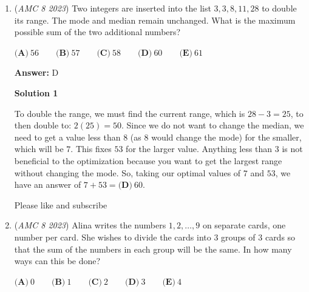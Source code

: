 \begin{enumerate}
 



\textbf{Solution 2}

Subtracting the larger equilateral triangle from the smaller one yields the sum of the three trapezoids. Since the ratio of the side lengths of the larger to the smaller one is $3:2$, we can set the side lengths as $3$ and $2$, respectively. So, the sum of the trapezoids is $\frac{9\sqrt{3}}{4}-\frac{4\sqrt{3}}{4}=\frac{5}{4}\sqrt{3}$. We are also told that the three trapezoids are congruent, thus the area of each of them is $\frac{1}{3} \cdot \frac{5}{4}\sqrt{3}=\frac{5}{12}\sqrt{3}$. Hence, the ratio is $\frac{\frac{5}{12}\sqrt{3}}{\sqrt{3}}=\frac{5}{12}=\boxed{\textbf{(C) } 5 : 12}$.

 


	\item (\textit{AMC 8 2023}) Two integers are inserted into the list $3,3,8,11,28$ to double its range. The mode and median remain unchanged. What is the maximum possible sum of the two additional numbers?


 $\textbf{(A)}\ 56 \qquad \textbf{(B)}\ 57 \qquad \textbf{(C)}\ 58 \qquad \textbf{(D)}\ 60 \qquad \textbf{(E)}\ 61$

 \textbf{Answer: }D



\textbf{Solution 1}

To double the range, we must find the current range, which is $28 - 3 = 25$, to then double to: $2(25) = 50$. Since we do not want to change the median, we need to get a value less than $8$ (as $8$ would change the mode) for the smaller, which will be $7$. This fixes $53$ for the larger value. Anything less than $3$ is not beneficial to the optimization because you want to get the largest range without changing the mode. So, taking our optimal values of $7$ and $53$, we have an answer of $7 + 53 = \boxed{\textbf{(D)}\ 60}$.

 Please like and subscribe

 


	\item (\textit{AMC 8 2023}) Alina writes the numbers $1, 2, \dots , 9$ on separate cards, one number per card. She wishes to divide the cards into $3$ groups of $3$ cards so that the sum of the numbers in each group will be the same. In how many ways can this be done?


 $\textbf{(A)}\ 0 \qquad \textbf{(B)}\ 1 \qquad \textbf{(C)}\ 2 \qquad \textbf{(D)}\ 3 \qquad \textbf{(E)}\ 4$


\end{enumerate}
